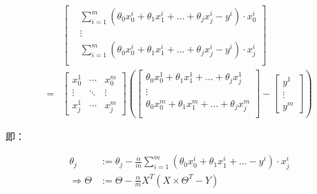 \documentclass[12pt, a4paper]{article}
\begin{document}
\begin{enumerate}
          \begin{align*}
                & \left[
                  \begin{matrix}
                       & \sum_{i=1}^{m}(\theta_0x_0^i+\theta_1x_1^i+\dots+\theta_jx_j^i-y^i)\cdot x_0^i \\
                       & \vdots                                                                         \\
                       & \sum_{i=1}^{m}(\theta_0x_0^i+\theta_1x_1^i+\dots+\theta_jx_j^i-y^i)\cdot x_j^i \\
                  \end{matrix}
                  \right] \\
              = & 
              \left[
                  \begin{matrix}
                      x_0^1  & \cdots & x_0^m  \\
                      \vdots & \ddots & \vdots \\
                      x_j^1  & \cdots & x_j^m
                  \end{matrix}
                  \right]
              \left(\left[
                  \begin{matrix}
                      \theta_0x_0^1+\theta_1x_1^1+\dots+\theta_jx_j^1 \\
                      \vdots                                          \\
                      \theta_0x_0^m+\theta_1x_1^m+\dots+\theta_jx_j^m \\
                  \end{matrix}
                  \right]-
              \left[
                  \begin{matrix}
                      y^1    \\
                      \vdots \\
                      y^m
                  \end{matrix}
                  \right]\right)
          \end{align*}
          
          即：
          
          \begin{align*}
              \theta_j          & :=\theta_j-\frac{\alpha}{m}\sum_{i=1}^{m}(\theta_0x_0^i+\theta_1x_1^i+\dots-y^i)\cdot x_j^i \\
              \Rightarrow\Theta & :=\Theta-\frac{\alpha}{m}X^T(X\times \Theta^T-Y)
          \end{align*}
          

\end{enumerate}
\end{document}
